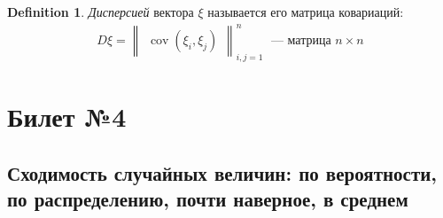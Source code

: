 \documentclass[a4paper]{article}
\theoremstyle{plain}
\theoremstyle{remark}
\theoremstyle{definition}
\newtheorem{definition}{Definition}
\DeclareMathOperator{\cov}{cov}
\begin{document}
\begin{definition}
  \emph{Дисперсией} вектора $\xi$ называется его матрица ковариаций:
  \begin{align*}
    D\xi = \begin{Vmatrix}\cov(\xi_i, \xi_j)\end{Vmatrix}_{i, j = 1}^{n}\; 
    \text{ --- матрица $n \times n$}
  \end{align*}

\end{definition}

\section{Билет №4}
\subsection{Сходимость случайных величин: по вероятности, по распределению, почти наверное, в среднем}
\end{document}
